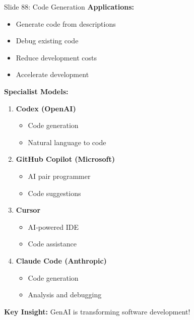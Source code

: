 \documentclass[8pt]{beamer}
\begin{document}
	\begin{frame}{Slide 88: Code Generation}
		\fontsize{6.5}{7.5}\selectfont
		\textbf{Applications:}
		\begin{itemize}
			\item Generate code from descriptions
			\item Debug existing code
			\item Reduce development costs
			\item Accelerate development
		\end{itemize}
		
		\vspace{0.1cm}
		\textbf{Specialist Models:}
		\begin{enumerate}
			\item \textbf{Codex (OpenAI)}
			\begin{itemize}
				\item Code generation
				\item Natural language to code
			\end{itemize}
			\item \textbf{GitHub Copilot (Microsoft)}
			\begin{itemize}
				\item AI pair programmer
				\item Code suggestions
			\end{itemize}
			\item \textbf{Cursor}
			\begin{itemize}
				\item AI-powered IDE
				\item Code assistance
			\end{itemize}
			\item \textbf{Claude Code (Anthropic)}
			\begin{itemize}
				\item Code generation
				\item Analysis and debugging
			\end{itemize}
		\end{enumerate}
		
		\textcolor{myblue}{\textbf{Key Insight:}} GenAI is transforming software development!
	\end{frame}
	
\end{document}
